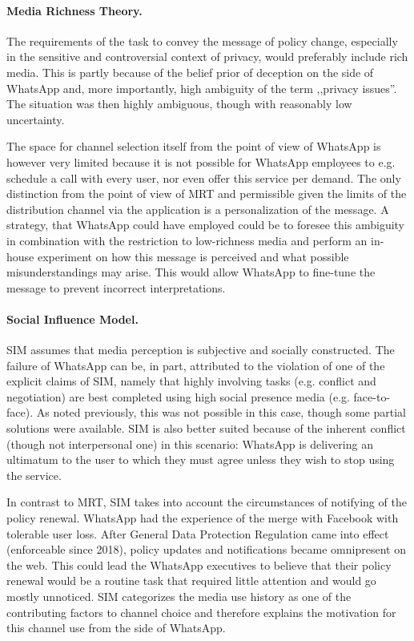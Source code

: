 \paragraph{Media Richness Theory.}
The requirements of the task to convey the message of policy change, especially in the sensitive and controversial context of privacy, would preferably include rich media.
This is partly because of the belief prior of deception on the side of WhatsApp and, more importantly, high ambiguity of the term ,,privacy issues''.
The situation was then highly ambiguous, though with reasonably low uncertainty.

The space for channel selection itself from the point of view of WhatsApp is however very limited because it is not possible for WhatsApp employees to e.g. schedule a call with every user, nor even offer this service per demand.
The only distinction from the point of view of MRT and permissible given the limits of the distribution channel via the application is a personalization of the message.
A strategy, that WhatsApp could have employed could be to foresee this ambiguity in combination with the restriction to low-richness media and perform an in-house experiment on how this message is perceived and what possible misunderstandings may arise.
This would allow WhatsApp to fine-tune the message to prevent incorrect interpretations.

\paragraph{Social Influence Model.}
SIM assumes that media perception is subjective and socially constructed.
The failure of WhatsApp can be, in part, attributed to the violation of one of the explicit claims of SIM, namely that highly involving tasks (e.g. conflict and negotiation) are best completed using high social presence media (e.g. face-to-face).
As noted previously, this was not possible in this case, though some partial solutions were available.
SIM is also better suited because of the inherent conflict (though not interpersonal one) in this scenario: WhatsApp is delivering an ultimatum to the user to which they must agree unless they wish to stop using the service.

In contrast to MRT, SIM takes into account the circumstances of notifying of the policy renewal.
WhatsApp had the experience of the merge with Facebook with tolerable user loss.
After General Data Protection Regulation came into effect (enforceable since 2018), policy updates and notifications became omnipresent on the web.
This could lead the WhatsApp executives to believe that their policy renewal would be a routine task that required little attention and would go mostly unnoticed.
SIM categorizes the media use history as one of the contributing factors to channel choice and therefore explains the motivation for this channel use from the side of WhatsApp.


